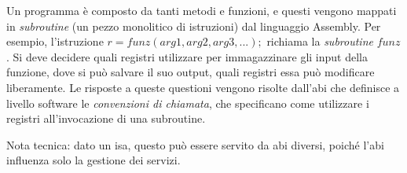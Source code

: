 \documentclass[class=book, crop=false, oneside]{standalone}
\begin{document}
Un programma è composto da tanti metodi e funzioni, e questi vengono mappati in \emph{subroutine} (un pezzo monolitico di istruzioni) dal linguaggio Assembly. Per esempio, l’istruzione $r=funz(arg1, arg2, arg3, ...);$ richiama la \emph{subroutine} \(funz\). Si deve decidere quali registri utilizzare per immagazzinare gli input della funzione, dove si può salvare il suo output, quali registri essa può modificare liberamente. Le risposte a queste questioni vengono risolte dall’\acrshort{abi} che definisce a livello software le \emph{convenzioni di chiamata}, che specificano come utilizzare i registri all’invocazione di una subroutine.

Nota tecnica: dato un \acrshort{isa}, questo può essere servito da \acrshort{abi} diversi, poiché l’\acrshort{abi} influenza solo la gestione dei servizi.
\end{document}
